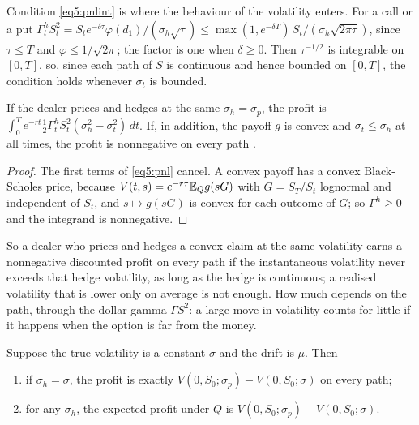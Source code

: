 \begin{chapterrefs}
Condition \cref{eq5:pnlint} is where the behaviour of the volatility enters. For a call or a put
$\Gamma^h_tS_t^2=S_te^{-\delta\tau}\varphi(d_1)/(\sigma_h\sqrt\tau)\le\max(1,e^{-\delta T})\,S_t/(\sigma_h\sqrt{2\pi\tau})$,
since $\tau\le T$ and $\varphi\le1/\sqrt{2\pi}$; the factor is one when $\delta\ge0$. Then
$\tau^{-1/2}$ is integrable on $[0,T]$, so, since each path of $S$ is continuous and hence bounded on
$[0,T]$, the condition holds whenever $\sigma_t$ is bounded.

\begin{corollary}[Robustness]\label{cor5:robust}
If the dealer prices and hedges at the same $\sigma_h=\sigma_p$, the profit is
$\int_0^Te^{-rt}\tfrac12\Gamma^h_tS_t^2(\sigma_h^2-\sigma_t^2)\,dt$. If, in addition, the payoff $g$ is
convex and $\sigma_t\le\sigma_h$ at all times, the profit is nonnegative on every
path \parencite{elkaroui1998}.
\end{corollary}

\begin{proof}
The first terms of \cref{eq5:pnl} cancel. A convex payoff has a convex Black-Scholes price, because
$V(t,s)=e^{-r\tau}\mathbb{E}_Qg(sG)$ with $G=S_T/S_t$ lognormal and independent of $S_t$, and
$s\mapsto g(sG)$ is convex for each outcome of $G$; so $\Gamma^h\ge0$ and the integrand is
nonnegative.
\end{proof}

So a dealer who prices and hedges a convex claim at the same volatility earns a nonnegative discounted
profit on every path if the instantaneous volatility never exceeds that hedge volatility, as long as
the hedge is continuous; a realised volatility that is lower only on average is not enough. How much depends on the path, through the dollar gamma
$\Gamma S^2$: a large move in volatility counts for little if it happens when the option is far from the
money.

\begin{proposition}\label{prop5:qmean}
Suppose the true volatility is a constant $\sigma$ and the drift is $\mu$. Then
\begin{enumerate}[label=(\roman*)]
  \item if $\sigma_h=\sigma$, the profit is exactly $V(0,S_0;\sigma_p)-V(0,S_0;\sigma)$ on every path;
  \item for any $\sigma_h$, the expected profit under $Q$ is $V(0,S_0;\sigma_p)-V(0,S_0;\sigma)$.
\end{enumerate}
\end{proposition}


\end{chapterrefs}
